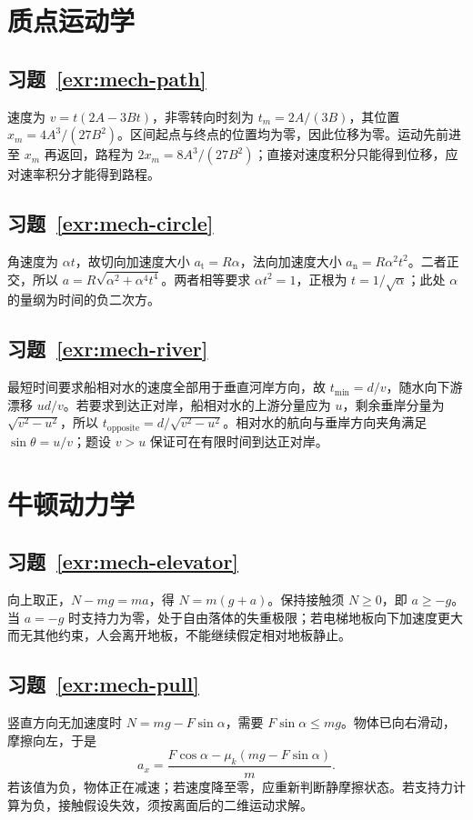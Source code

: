 \documentclass[UTF8,12pt,a4paper,fontset=fandol]{ctexbook}
\begin{document}
\section{质点运动学}
\subsection*{习题~\ref{exr:mech-path}}
速度为 $v=t(2A-3Bt)$，非零转向时刻为 $t_m=2A/(3B)$，其位置 $x_m=4A^3/(27B^2)$。区间起点与终点的位置均为零，因此位移为零。运动先前进至 $x_m$ 再返回，路程为 $2x_m=8A^3/(27B^2)$；直接对速度积分只能得到位移，应对速率积分才能得到路程。

\subsection*{习题~\ref{exr:mech-circle}}
角速度为 $\alpha t$，故切向加速度大小 $a_{\mathrm t}=R\alpha$，法向加速度大小 $a_{\mathrm n}=R\alpha^2t^2$。二者正交，所以 $a=R\sqrt{\alpha^2+\alpha^4t^4}$。两者相等要求 $\alpha t^2=1$，正根为 $t=1/\sqrt\alpha$；此处 $\alpha$ 的量纲为时间的负二次方。

\subsection*{习题~\ref{exr:mech-river}}
最短时间要求船相对水的速度全部用于垂直河岸方向，故 $t_{\min}=d/v$，随水向下游漂移 $ud/v$。若要求到达正对岸，船相对水的上游分量应为 $u$，剩余垂岸分量为 $\sqrt{v^2-u^2}$，所以 $t_{\mathrm{opposite}}=d/\sqrt{v^2-u^2}$。相对水的航向与垂岸方向夹角满足 $\sin\theta=u/v$；题设 $v>u$ 保证可在有限时间到达正对岸。

\section{牛顿动力学}
\subsection*{习题~\ref{exr:mech-elevator}}
向上取正，$N-mg=ma$，得 $N=m(g+a)$。保持接触须 $N\ge0$，即 $a\ge-g$。当 $a=-g$ 时支持力为零，处于自由落体的失重极限；若电梯地板向下加速度更大而无其他约束，人会离开地板，不能继续假定相对地板静止。

\subsection*{习题~\ref{exr:mech-pull}}
竖直方向无加速度时 $N=mg-F\sin\alpha$，需要 $F\sin\alpha\le mg$。物体已向右滑动，摩擦向左，于是
\[
 a_x=\frac{F\cos\alpha-\mu_k(mg-F\sin\alpha)}{m}.
\]
若该值为负，物体正在减速；若速度降至零，应重新判断静摩擦状态。若支持力计算为负，接触假设失效，须按离面后的二维运动求解。
\end{document}
